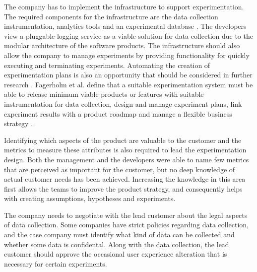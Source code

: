 \documentclass[english]{tktltiki2}
\theoremstyle{definition}
\theoremstyle{remark}
\begin{document}
The company has to implement the infrastructure to support experimentation. The required components for the infrastructure are the data collection instrumentation, analytics tools and an experimental database \cite{kohavi2007practical, fagerholm2014building}. The developers view a pluggable logging service as a viable solution for data collection due to the modular architecture of the software products. The infrastructure should also allow the company to manage experiments by providing functionality for quickly executing and terminating experiments. Automating the creation of experimentation plans is also an opportunity that should be considered in further research \cite{fagerholm2014building}. Fagerholm et al. define that a suitable experimentation system must be able to release minimum viable products or features with suitable instrumentation for data collection, design and manage experiment plans, link experiment results with a product roadmap and manage a flexible business strategy \cite{fagerholm2014building}.

Identifying which aspects of the product are valuable to the customer and the metrics to measure these attributes is also required to lead the experimentation design. Both the management and the developers were able to name few metrics that are perceived as important for the customer, but no deep knowledge of actual customer needs has been achieved. Increasing the knowledge in this area first allows the teams to improve the product strategy, and consequently helps with creating assumptions, hypotheses and experiments. 

The company needs to negotiate with the lead customer about the legal aspects of data collection. Some companies have strict policies regarding data collection, and the case company must identify what kind of data can be collected and whether some data is confidental. Along with the data collection, the lead customer should approve the occasional user experience alteration that is necessary for certain experiments. 
\end{document}
